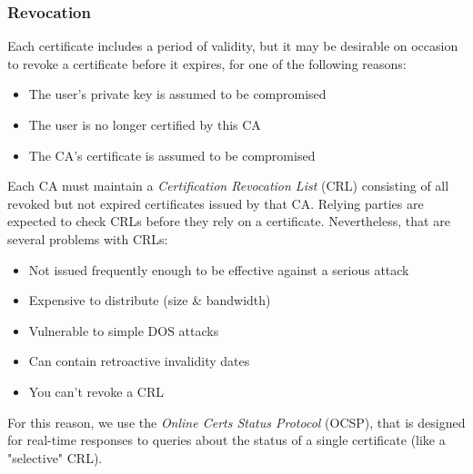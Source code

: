 \subsubsection{Revocation}
Each certificate includes a period of validity, but it may be desirable on occasion to revoke a certificate before it expires, for one of the following reasons:
\begin{itemize}
    \item The user’s private key is assumed to be compromised
    \item The user is no longer certified by this CA
    \item The CA’s certificate is assumed to be compromised
\end{itemize}
Each CA must maintain a \textit{Certification Revocation List} (CRL) consisting of all revoked but not expired certificates issued by that CA. Relying parties are expected to check CRLs before they rely on a certificate. Nevertheless, that are several problems with CRLs:
\begin{itemize}
    \item Not issued frequently enough to be effective against a serious attack
    \item Expensive to distribute (size \& bandwidth)
    \item Vulnerable to simple DOS attacks
    \item Can contain retroactive invalidity dates
    \item You can't revoke a CRL
\end{itemize}
For this reason, we use the \textit{Online Certs Status Protocol} (OCSP), that is designed for real-time responses to queries about the status of a single certificate (like a "selective" CRL).